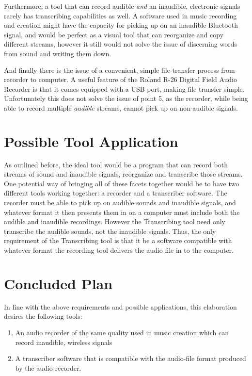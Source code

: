 \documentclass{article}
\begin{document}
Furthermore, a tool that can record audible  \textit{and} an inaudible, electronic signals rarely has transcribing capabilities as well. A software used in music recording and creation might have the capacity for picking up on an inaudible Bluetooth signal, and would be perfect as a visual tool that can reorganize and copy different streams, however it still would not solve the issue of discerning words from sound and writing them down.

And finally there is the issue of a convenient, simple file-transfer process from recorder to computer. A useful feature of the Roland R-26 Digital Field Audio Recorder is that it comes equipped with a USB port, making file-transfer simple. Unfortunately this does not solve the issue of point 5, as the recorder, while being able to record multiple \textit{audible} streams, cannot pick up on non-audible signals.

\section{Possible Tool Application}
As outlined before, the ideal tool would be a program that can record both streams of sound and inaudible signals, reorganize and transcribe those streams. One potential way of bringing all of these facets together would be to have two different tools working together: a recorder and a transcriber software. The recorder must be able to pick up on audible sounds and inaudible signals, and whatever format it then presents them in on a computer must include both the audible and inaudible recordings. However the Transcribing tool need only transcribe the audible sounds, not the inaudible signals. Thus, the only requirement of the Transcribing tool is that it be a software compatible with whatever format the recording tool delivers the audio file in to the computer.

\section{Concluded Plan}
In line with the above requirements and possible applications,  this elaboration desires the following tools: 
\begin{enumerate}
\item An audio recorder of the same quality used in music creation which can record inaudible, wireless signals
\item A transcriber software that is compatible with the audio-file format produced by the audio recorder.
\end{enumerate}
\end{document}
